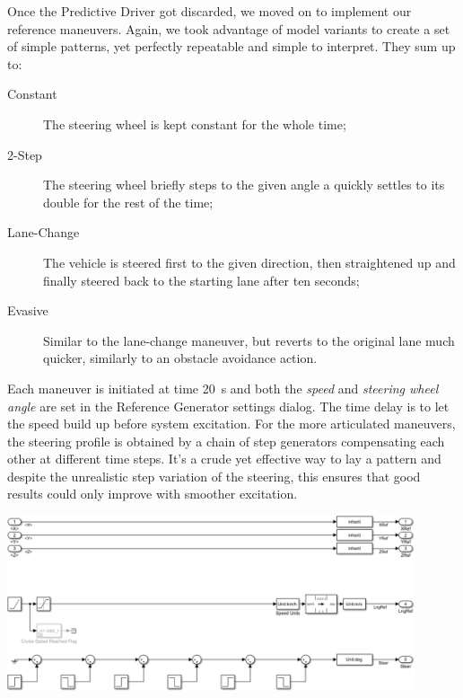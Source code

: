 		Once the Predictive Driver got discarded, we moved on to implement our reference maneuvers. Again, we took advantage of \mwSL{} model variants to create a set of
		simple patterns, yet perfectly repeatable and simple to interpret. They sum up to:
		\begin{description}

			\item[Constant] The steering wheel is kept constant for the whole time;

			\item[2-Step] The steering wheel briefly steps to the given angle a quickly settles to its double for the rest of the time;

			\item[Lane-Change] The vehicle is steered first to the given direction, then straightened up and finally steered back to the starting lane after ten seconds;

			\item[Evasive] Similar to the lane-change maneuver, but reverts to the original lane much quicker, similarly to an obstacle avoidance action.

		\end{description}
		
		Each maneuver is initiated at time \SI{20}{\second} and both the \emph{speed} and \emph{steering wheel angle} are set in the Reference Generator settings dialog.
		The time delay is to let the speed build up before system excitation. For the more articulated maneuvers, the steering profile is obtained by a chain of step generators
		compensating each other at different time steps. It's a crude yet effective way to lay a pattern and despite the unrealistic step variation of the steering, this ensures that
		good results could only improve with smoother excitation.
		\begin{center}
			\includegraphics[width=0.9\textwidth]{Images/Simulator/cm-s-full}
		\end{center}


